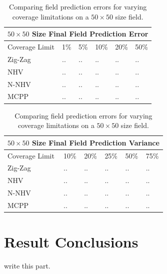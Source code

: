 \begin{table}[htb!]
\centering
	\begin{tabular}{ |p{3cm}||p{1cm}|p{1cm}|p{1cm}|p{1cm}|p{1cm}|  }
		\hline
		\multicolumn{6}{|c|}{$50 \times 50$ Size Final Field Prediction Error} \\
		\hline
		Coverage Limit & 1\% & 5\% & 10\% & 20\% & 50\% \\
		\hline
		Zig-Zag        & .. & .. & .. & .. & .. \\
		NHV            & .. & .. & .. & .. & .. \\
		N-NHV          & .. & .. & .. & .. & .. \\
		MCPP           & .. & .. & .. & .. & .. \\
		\hline
	\end{tabular}
	\caption{Comparing field prediction errors for varying coverage limitations on a $50 \times 50$ size field.}
    \label{tab:50fieldprederr}
\end{table}

\begin{table}[htb!]
\centering
	\begin{tabular}{ |p{3cm}||p{1cm}|p{1cm}|p{1cm}|p{1cm}|p{1cm}|  }
		\hline
		\multicolumn{6}{|c|}{$50 \times 50$ Size Final Field Prediction Variance} \\
		\hline
		Coverage Limit & 10\% & 20\% & 25\% & 50\% & 75\% \\
		\hline
		Zig-Zag        & .. & .. & .. & .. & .. \\
		NHV            & .. & .. & .. & .. & .. \\
		N-NHV          & .. & .. & .. & .. & .. \\
		MCPP           & .. & .. & .. & .. & .. \\
		\hline
	\end{tabular}
	\caption{Comparing field prediction errors for varying coverage limitations on a $50 \times 50$ size field.}
    \label{tab:50fieldvar}
\end{table}

\section{Result Conclusions}
write this part.